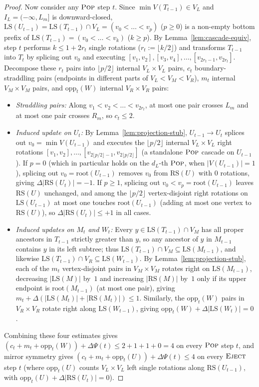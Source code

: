 \documentclass[11pt]{article}
\theoremstyle{definition}
\theoremstyle{remark}
\newcommand{\LS}{\mathrm{LS}}
\newcommand{\RS}{\mathrm{RS}}
\newcommand{\POP}{\textnormal{\scshape Pop}}
\newcommand{\EJECT}{\textnormal{\scshape Eject}}
\begin{document}
\begin{proof}
Now consider any $\POP$ step $t$. Since $\min V(T_{t-1}) \in V_L$ and $I_L = (-\infty, L_m]$ is downward-closed, $\LS(U_{t-1}) = \LS(T_{t-1}) \cap V_L = (v_0 < \dots < v_p)$ ($p \ge 0$) is a non-empty bottom prefix of $\LS(T_{t-1}) = (v_0 < \dots < v_k)$ ($k \ge p$). By Lemma~\ref{lem:cascade-equiv}, step $t$ performs $k \le 1 + 2 r_t$ single rotations ($r_t := \lfloor k / 2 \rfloor$) and transforms $T_{t-1}$ into $T_t$ by splicing out $v_0$ and executing $[v_1, v_2], [v_3, v_4], \dots, [v_{2r_t - 1}, v_{2r_t}]$. Decompose these $r_t$ pairs into $\lfloor p / 2 \rfloor$ internal $V_L \times V_L$ pairs, $c_t$ boundary-straddling pairs (endpoints in different parts of $V_L < V_M < V_R$), $m_t$ internal $V_M \times V_M$ pairs, and $\mathrm{opp}_t(W)$ internal $V_R \times V_R$ pairs:
\begin{itemize}[leftmargin=2em]
  \item \emph{Straddling pairs:} Along $v_1 < v_2 < \dots < v_{2r_t}$, at most one pair crosses $L_m$ and at most one pair crosses $R_m$, so $c_t \le 2$.
  \item \emph{Induced update on $U_t$:} By Lemma~\ref{lem:projection-stub}, $U_{t-1} \to U_t$ splices out $v_0 = \min V(U_{t-1})$ and executes the $\lfloor p / 2 \rfloor$ internal $V_L \times V_L$ right rotations $[v_1, v_2], \dots, [v_{2\lfloor p/2 \rfloor - 1}, v_{2\lfloor p/2 \rfloor}]$ (a standalone $\POP$ cascade on $U_{t-1}$). If $p = 0$ (which in particular holds on the $d_L$-th $\POP$, when $|V(U_{t-1})| = 1$), splicing out $v_0 = \mathrm{root}(U_{t-1})$ removes $v_0$ from $\RS(U)$ with $0$ rotations, giving $\Delta|\RS(U_t)| = -1$. If $p \ge 1$, splicing out $v_0 < v_p = \mathrm{root}(U_{t-1})$ leaves $\RS(U)$ unchanged, and among the $\lfloor p / 2 \rfloor$ vertex-disjoint right rotations on $\LS(U_{t-1})$ at most one touches $\mathrm{root}(U_{t-1})$ (adding at most one vertex to $\RS(U)$), so $\Delta|\RS(U_t)| \le +1$ in all cases.
  \item \emph{Induced updates on $M_t$ and $W_t$:} Every $y \in \LS(T_{t-1}) \cap V_M$ has all proper ancestors in $T_{t-1}$ strictly greater than $y$, so any ancestor of $y$ in $M_{t-1}$ contains $y$ in its left subtree; thus $\LS(T_{t-1}) \cap V_M \subseteq \LS(M_{t-1})$, and likewise $\LS(T_{t-1}) \cap V_R \subseteq \LS(W_{t-1})$. By Lemma~\ref{lem:projection-stub}, each of the $m_t$ vertex-disjoint pairs in $V_M \times V_M$ rotates right on $\LS(M_{t-1})$, decreasing $|\LS(M)|$ by~$1$ and increasing $|\RS(M)|$ by~$1$ only if its upper endpoint is $\mathrm{root}(M_{t-1})$ (at most one pair), giving $m_t + \Delta(|\LS(M_t)| + |\RS(M_t)|) \le 1$. Similarly, the $\mathrm{opp}_t(W)$ pairs in $V_R \times V_R$ rotate right along $\LS(W_{t-1})$, giving $\mathrm{opp}_t(W) + \Delta|\LS(W_t)| = 0$.
\end{itemize}
Combining these four estimates gives $(c_t + m_t + \mathrm{opp}_t(W)) + \Delta\Psi(t) \le 2 + 1 + 1 + 0 = 4$ on every $\POP$ step $t$, and mirror symmetry gives $(c_t + m_t + \mathrm{opp}_t(U)) + \Delta\Psi(t) \le 4$ on every $\EJECT$ step $t$ (where $\mathrm{opp}_t(U)$ counts $V_L \times V_L$ left single rotations along $\RS(U_{t-1})$, with $\mathrm{opp}_t(U) + \Delta|\RS(U_t)| = 0$).


\end{proof}
\end{document}
